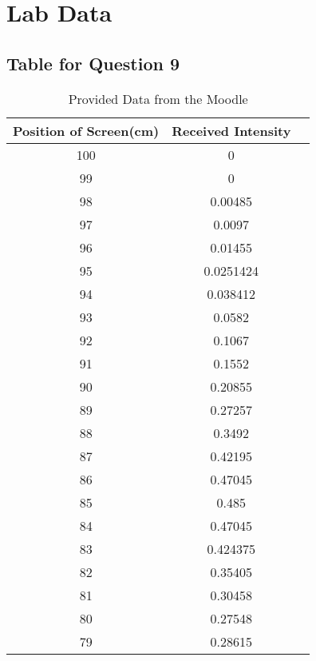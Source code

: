 \documentclass[12pt]{article}
\begin{document}
    \section{Lab Data}
        \subsection{Table for Question 9}
            \begin{table}[H]
                \centering
                \caption{Provided Data from the Moodle}
                \begin{tabular}{c c c}
                \hline
                Position of Screen(cm) & Received Intensity \\
                \hline
                100  & 0         \\
                99   & 0         \\
                98   & 0.00485   \\
                97   & 0.0097    \\
                96   & 0.01455   \\
                95   & 0.0251424 \\
                94   & 0.038412  \\
                93   & 0.0582    \\
                92   & 0.1067    \\
                91   & 0.1552    \\
                90   & 0.20855   \\
                89   & 0.27257   \\
                88   & 0.3492    \\
                87   & 0.42195   \\
                86   & 0.47045   \\
                85   & 0.485     \\
                84   & 0.47045   \\
                83   & 0.424375  \\
                82   & 0.35405   \\
                81   & 0.30458   \\
                80   & 0.27548   \\
                79   & 0.28615   \\
                \hline
                \end{tabular}
            \end{table}
\end{document}
